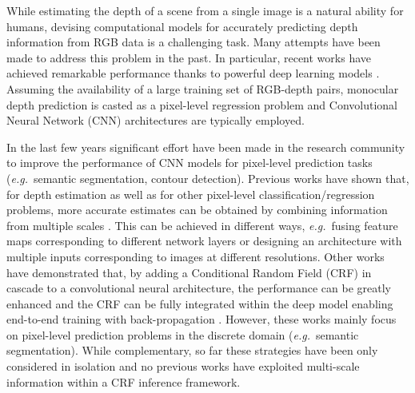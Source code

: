 \documentclass[10pt,twocolumn,letterpaper]{article}
\def\eg{\textit{e.g.}~}
\begin{document}
While estimating the depth of a scene from
a single image is a natural ability for humans, devising computational models for 
accurately predicting depth information from RGB data is a challenging task.
Many attempts have been made to address this problem in the past. In particular, recent works have achieved 
remarkable performance thanks to powerful deep learning models \cite{eigen2015predicting,eigen2014depth,liu2015deep,porzi2017learning}. Assuming the 
availability of a large training set of RGB-depth pairs, 
monocular depth prediction is casted as a pixel-level regression problem and 
Convolutional Neural Network (CNN) architectures are typically employed.

In the last few years significant effort have been made in the research community 
to improve the performance of CNN models for pixel-level prediction tasks (\eg semantic segmentation, contour detection).
Previous works have shown that, for depth estimation as well as for other pixel-level classification/regression problems, more accurate estimates can be obtained by combining information from multiple scales \cite{eigen2015predicting,xie2015holistically,chen2015attention}. 
This can be achieved in different ways, \eg fusing feature maps corresponding to different network layers or 
designing an architecture with multiple inputs corresponding to images at different resolutions. 
Other works have demonstrated that, by adding a Conditional Random Field (CRF) in cascade to a convolutional neural architecture, the performance 
can be greatly enhanced and the CRF can be fully integrated within the deep model enabling end-to-end training 
with back-propagation \cite{zheng2015conditional}. However, these works mainly 
focus on pixel-level prediction problems in the discrete domain (\eg semantic segmentation).
While complementary, so far these strategies have been only considered in isolation and 
no previous works have exploited multi-scale information within a CRF inference framework. 
\end{document}
